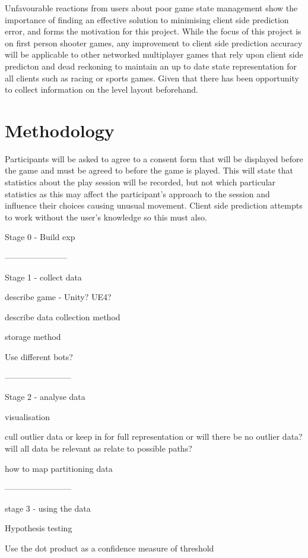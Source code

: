 \documentclass[journal]{IEEEtran}
\begin{document}
Unfavourable reactions from users about poor game state management show the importance of finding an effective solution to minimising client side prediction error, and forms the motivation for this project. While the focus of this project is on first person shooter games, any improvement to client side prediction accuracy will be applicable to other networked multiplayer games that rely upon client side predicton and dead reckoning to maintain an up to date state representation for all clients such as racing or sports games. Given that there has been opportunity to collect information on the level layout beforehand.

\section{Methodology}




Participants will be asked to agree to a consent form that will be displayed before the game and must be agreed to before the game is played. This will state that statistics about the play session will be recorded, but not which particular statistics as this may affect the participant's approach to the session and influence their choices causing unusual movement. Client side prediction attempts to work without the user's knowledge so this must also.




Stage 0 - Build exp

-----------------------

Stage 1 - collect data

describe game - Unity? UE4?

describe data collection method

storage method

Use different bots?

------------------------

Stage 2 - analyse data

visualisation

cull outlier data or keep in for full representation or will there be no outlier data? will all data be relevant as relate to possible paths?

how to map partitioning data

------------------------

stage 3 - using the data

Hypothesis testing

Use the dot product as a confidence measure of threshold
\end{document}
